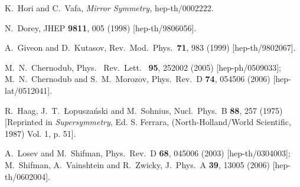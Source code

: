 \documentclass[epsfig,12pt]{article}
\begin{document}
\begin{thebibliography}{99}
K.~Hori and C.~Vafa,
{\em Mirror Symmetry,}
hep-th/0002222.

N.~Dorey,
JHEP {\bf 9811}, 005 (1998) [hep-th/9806056].

  A.~Giveon and D.~Kutasov,
  Rev.\ Mod.\ Phys.\  {\bf 71}, 983 (1999)
  [hep-th/9802067].

M.~N.~Chernodub,
 Phys. \ Rev.\ Lett. \ {\bf 95}, 252002 (2005) [hep-ph/0509033];
M.~N.~Chernodub and S.~M.~Morozov,
 Phys.\ Rev.\  D {\bf 74},   054506 (2006) [hep-lat/0512041].



R.~Haag, J.~T.~{\L}opusza\'nski and M.~Sohnius,
Nucl.\ Phys.\ B {\bf 88}, 257 (1975)
[Reprinted in {\em Supersymmetry},
Ed. S. Ferrara, (North-Holland/World Scientific, 1987) Vol. 1, p.  51].

A.~Losev and M.~Shifman,
Phys.\ Rev.\ D {\bf 68}, 045006 (2003)
[hep-th/0304003];
M.~Shifman, A.~Vainshtein and R.~Zwicky,
  J.\ Phys.\ A {\bf 39}, 13005 (2006)
  [hep-th/0602004].


  
\end{thebibliography}
\end{document}
